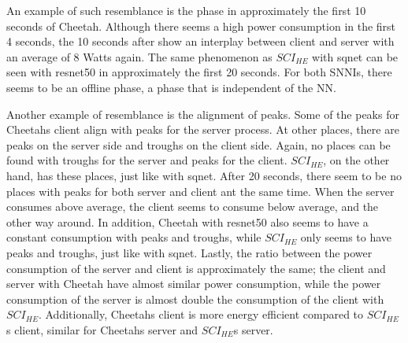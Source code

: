 \documentclass[../thesis.tex]{subfiles}
\begin{document}


An example of such resemblance is the phase in approximately the first 10 seconds of Cheetah. Although there seems a high power consumption in the first 4 seconds, the 10 seconds after show an interplay between client and server with an average of 8 Watts again. The same phenomenon as $SCI_{HE}$ with sqnet can be seen with resnet50 in approximately the first 20 seconds. For both SNNIs, there seems to be an offline phase, a phase that is independent of the NN. 

Another example of resemblance is the alignment of peaks. Some of the peaks for Cheetahs client align with peaks for the server process. At other places, there are peaks on the server side and troughs on the client side. Again, no places can be found with troughs for the server and peaks for the client. $SCI_{HE}$, on the other hand, has these places, just like with sqnet. After 20 seconds, there seem to be no places with peaks for both server and client ant the same time. When the server consumes above average, the client seems to consume below average, and the other way around. In addition, Cheetah with resnet50 also seems to have a constant consumption with peaks and troughs, while $SCI_{HE}$ only seems to have peaks and troughs, just like with sqnet. Lastly, the ratio between the power consumption of the server and client is approximately the same; the client and server with Cheetah have almost similar power consumption, while the power consumption of the server is almost double the consumption of the client with $SCI_{HE}$. Additionally, Cheetahs client is more energy efficient compared to $SCI_{HE}$s client, similar for Cheetahs server and $SCI_{HE}$s server.
\end{document}
